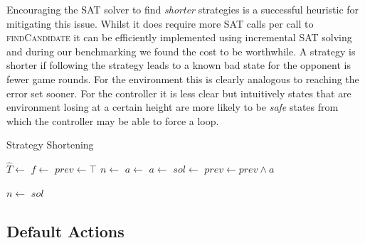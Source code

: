 Encouraging the SAT solver to find \emph{shorter} strategies is a successful heuristic for mitigating this issue. Whilst it does require more SAT calls per call to \textsc{findCandidate} it can be efficiently implemented using incremental SAT solving and during our benchmarking we found the cost to be worthwhile. A strategy is shorter if following the strategy leads to a known bad state for the opponent is fewer game rounds. For the environment this is clearly analogous to reaching the error set sooner. For the controller it is less clear but intuitively states that are environment losing at a certain height are more likely to be \emph{safe} states from which the controller may be able to force a loop.

\begin{algorithm}
    \caption{Strategy Shortening}
    \label{alg:strategyShortening}
    \begin{algorithmic}[1]
            \State $\hat{T} \gets $ 
            \State $f \gets $  \EndIfElse
            \State $prev \gets \top$
                \State $n \gets $ 
                        \State $a \gets $ 
                    \Else
                        \State $a \gets $ 
                    \EndIf
                    \State $sol \gets $ 
                        \State $prev \gets prev \land a$
                        \Break
                    \EndIf
                        
                    \State $n \gets $ 
                \EndWhile
            \EndFor
            \State \Return $sol$
        \EndFunction
    \end{algorithmic}
\end{algorithm}

\subsection{Default Actions}

